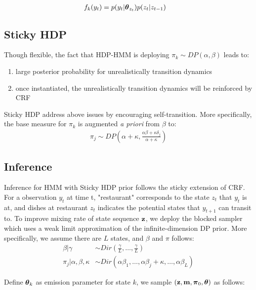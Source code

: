\documentclass{article} %
\begin{document}
\begin{align*}
f_k(y_t) &=  p(y_t | \boldsymbol{\theta}_{z_{t}}) p(z_{t}|z_{t-1}) 
\end{align*}


\subsection{Sticky HDP}
Though flexible, the fact that HDP-HMM is deploying $\pi_k \sim DP(\alpha, \beta)$ leads to:
\begin{enumerate}
\item large posterior probability for unrealistically transition dynamics
\item once instantiated, the unrealistically transition dynamics will be reinforced by CRF
\end{enumerate}
Sticky HDP address above issues by encouraging self-transition. More specifically, the base measure for $\pi_k$ is augmented \textit{a priori} from $\beta$ to:
\begin{align*}
\pi_j \sim 
DP(\alpha + \kappa, \frac{\alpha\beta + \kappa \delta_j}{\alpha + \kappa})
\end{align*}

\subsection{Inference }
Inference for HMM with Sticky HDP prior follows the sticky extension of CRF. For a observation $y_t$ at time t, "restaurant" corresponds to the state $z_t$ that $y_t$ is at, and dishes at restaurant $z_t$ indicates the potential states that $y_{t+1}$ can transit to. To improve mixing rate of state sequence ${\bf z}$, we deploy the blocked sampler which uses a weak limit approximation of the infinite-dimension DP prior. More specifically, we assume there are $L$ states, and $\beta$ and $\pi$ follows:
\begin{align*}
\beta | \gamma & \sim Dir(\frac{\gamma}{L}, \dots, \frac{\gamma}{L}) \\
\pi_j | \alpha, \beta, \kappa & \sim 
Dir(\alpha \beta_1, \dots, \alpha \beta_j + \kappa, \dots, \alpha \beta_L)
\end{align*}

Define $\boldsymbol{\theta}_k$ as emission parameter for state $k$, we sample $({\bf z}, {\bf m}, \boldsymbol{\pi}_0, \boldsymbol{\theta})$ as follows:
 
\end{document}
